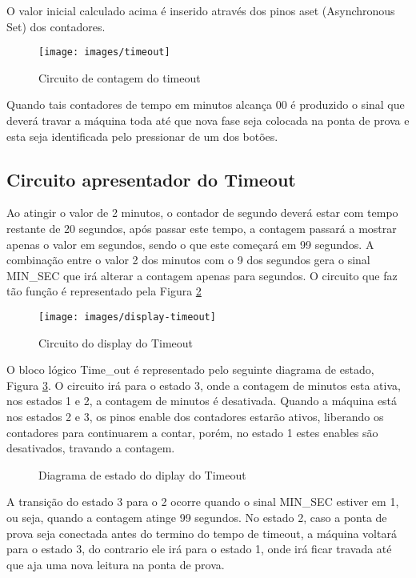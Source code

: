 \documentclass[12pt,a4paper,openany]{abntex2}
\begin{document}
O valor inicial calculado acima é inserido através dos pinos aset (Asynchronous Set) dos contadores.

\begin{figure}[!htp]
	\centering
	\caption{Circuito de contagem do timeout}
	\texttt{[image: images/timeout]}
	\label{fig:timeout}
\end{figure}

Quando tais contadores de tempo em minutos alcança 00 é produzido o sinal que deverá travar a máquina toda até que nova fase seja colocada na ponta de prova e esta seja identificada pelo pressionar de um dos botões.

\subsection{Circuito apresentador do Timeout}

Ao atingir o valor de 2 minutos, o contador de segundo deverá estar com tempo restante de 20 segundos, após passar este tempo, a contagem passará a mostrar apenas o valor em segundos, sendo o que este começará em 99 segundos. A combinação entre o valor 2 dos minutos com o 9 dos segundos gera o sinal MIN\_SEC que irá alterar a contagem apenas para segundos. O circuito que faz tão função é representado pela Figura \ref{fig:display-timeout}

\begin{figure}[!htp]
	\centering
	\caption{Circuito do display do Timeout}
	\texttt{[image: images/display-timeout]}	\label{fig:display-timeout}
\end{figure}

O bloco lógico Time\_out é representado pelo seguinte diagrama de estado, Figura \ref{fig:diagrama-de-estado-display-timeout}. O circuito irá para o estado 3, onde a contagem de minutos esta ativa, nos estados 1 e 2, a contagem de minutos é desativada. Quando a máquina está nos estados 2 e 3, os pinos enable dos contadores estarão ativos, liberando os contadores para continuarem a contar, porém, no estado 1 estes enables são desativados, travando a contagem.

\begin{figure}[!htp]
	\centering
	\caption{Diagrama de estado do diplay do Timeout}
	\label{fig:diagrama-de-estado-display-timeout}
\end{figure}

A transição do estado 3 para o 2 ocorre quando o sinal MIN\_SEC estiver em 1, ou seja, quando a contagem atinge 99 segundos. No estado 2, caso a ponta de prova seja conectada antes do termino do tempo de timeout, a máquina voltará para o estado 3, do contrario ele irá para o estado 1, onde irá ficar travada até que aja uma nova leitura na ponta de prova.
\end{document}
